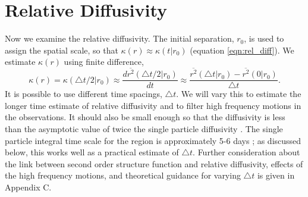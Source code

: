 \documentclass[]{ametsoc}
\begin{document}
\section{Relative Diffusivity}
Now we examine the relative diffusivity. The initial separation, $r_0$, is used to assign the spatial scale, so that $\kappa(r) \approx \kappa(t|r_0)$ (equation \ref{eqn:rel_diff}). 
We estimate $\kappa (r)$ using finite difference,
\begin{equation}
    \kappa (r) = \kappa (\triangle t/2|r_0) \approx \frac{d \overline{r^2}(\triangle t/2|r_0)}{dt} \approx \frac{ \overline{r^2}(\triangle t|r_0) - \overline{r^2}(0|r_0)}{\triangle t}.
\end{equation}
It is possible to use different time spacings,
$\triangle t$. 
We will vary this to estimate the longer time estimate of relative diffusivity 
and to filter 
high frequency motions in the observations.
It should also be small enough so that the diffusivity is less than the asymptotic value of twice the single particle diffusivity \citep{lacasce2008statistics}. The single particle integral time scale
for the region is approximately 5-6 days \citep{balwada2016}; as discussed below, this works well as a practical estimate of $\triangle t$.
Further consideration about the link between second order structure function and relative diffusivity, effects of the high frequency motions, and theoretical guidance for varying $\triangle t$ is given in Appendix C. 
\end{document}
